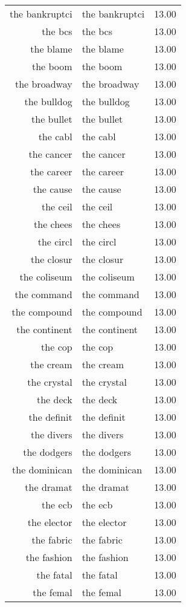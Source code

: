 \begin{table}[ht]
\begin{tabular}{rlr}
  the bankruptci & the bankruptci & 13.00 \\ 
  the bcs & the bcs & 13.00 \\ 
  the blame & the blame & 13.00 \\ 
  the boom & the boom & 13.00 \\ 
  the broadway & the broadway & 13.00 \\ 
  the bulldog & the bulldog & 13.00 \\ 
  the bullet & the bullet & 13.00 \\ 
  the cabl & the cabl & 13.00 \\ 
  the cancer & the cancer & 13.00 \\ 
  the career & the career & 13.00 \\ 
  the cause & the cause & 13.00 \\ 
  the ceil & the ceil & 13.00 \\ 
  the chees & the chees & 13.00 \\ 
  the circl & the circl & 13.00 \\ 
  the closur & the closur & 13.00 \\ 
  the coliseum & the coliseum & 13.00 \\ 
  the command & the command & 13.00 \\ 
  the compound & the compound & 13.00 \\ 
  the continent & the continent & 13.00 \\ 
  the cop & the cop & 13.00 \\ 
  the cream & the cream & 13.00 \\ 
  the crystal & the crystal & 13.00 \\ 
  the deck & the deck & 13.00 \\ 
  the definit & the definit & 13.00 \\ 
  the divers & the divers & 13.00 \\ 
  the dodgers & the dodgers & 13.00 \\ 
  the dominican & the dominican & 13.00 \\ 
  the dramat & the dramat & 13.00 \\ 
  the ecb & the ecb & 13.00 \\ 
  the elector & the elector & 13.00 \\ 
  the fabric & the fabric & 13.00 \\ 
  the fashion & the fashion & 13.00 \\ 
  the fatal & the fatal & 13.00 \\ 
  the femal & the femal & 13.00 \\ 

\end{tabular}
\end{table}
